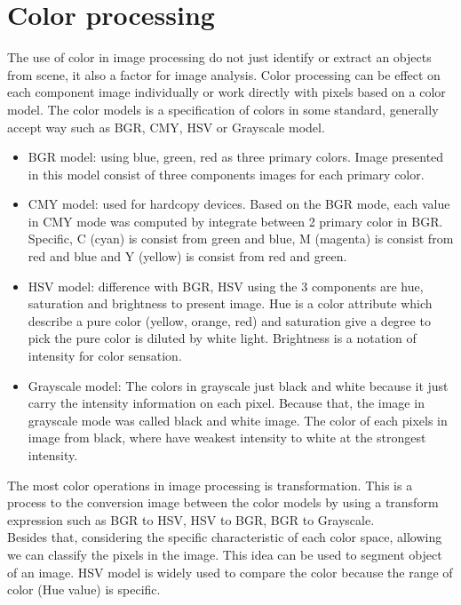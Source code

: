 \section{Color processing}\label{color_model}
The use of color in image processing do not just identify or extract an objects from scene, it also a factor for image analysis. Color processing can be effect on each component image individually or work directly with pixels based on a color model. The color models is a specification of colors in some standard, generally accept way such as BGR, CMY, HSV or Grayscale model.
\begin{itemize}
\item BGR model: using blue, green, red as three primary colors. Image presented in this model consist of three components images for each primary color.
\item CMY model: used for hardcopy devices. Based on the BGR mode, each value in CMY mode was computed by integrate between 2 primary color in BGR. Specific, C (cyan) is consist from green and blue, M (magenta) is consist from red and blue and Y (yellow) is consist from red and green.
\item HSV model: difference with BGR, HSV using the 3 components are hue, saturation and brightness to present image. Hue is a color attribute which describe a pure color (yellow, orange, red) and saturation give a degree to pick the pure color is diluted by white light. Brightness is a notation of intensity for color sensation.
\item Grayscale model: The colors in grayscale just black and white because it just carry the intensity information on each pixel. Because that, the image in grayscale mode was called black and white image. The color of each pixels in image from black, where have weakest intensity to white at the strongest intensity.
\end{itemize}
The most color operations in image processing is transformation. This is a process to the conversion image between the color models by using a transform expression such as BGR to HSV, HSV to BGR, BGR to Grayscale.\\[0.2cm]
Besides that, considering the specific characteristic of each color space, allowing we can classify the pixels in the image. This idea can be used to segment object of an image. HSV model is widely used to compare the color because the range of color (Hue value) is specific.
